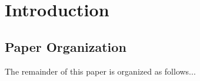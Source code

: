 \section{Introduction}
\label{sec:introduction}
\cite{buddhika2016neptune}

\subsection{Paper Organization}
The remainder of this paper is organized as follows...

